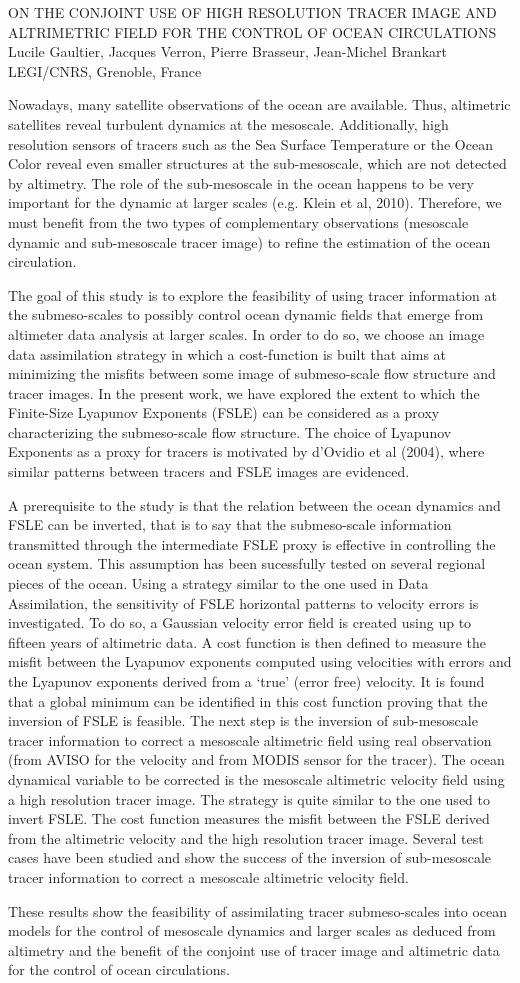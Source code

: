 ON THE CONJOINT USE OF HIGH RESOLUTION TRACER IMAGE AND ALTRIMETRIC FIELD FOR THE CONTROL OF OCEAN CIRCULATIONS
Lucile Gaultier, Jacques Verron, Pierre Brasseur, Jean-Michel Brankart
LEGI/CNRS, Grenoble, France


Nowadays, many satellite observations of the ocean are available. Thus, altimetric satellites reveal turbulent dynamics at the mesoscale.
Additionally, high resolution sensors of tracers such as the Sea Surface Temperature or the Ocean Color reveal even smaller structures at the sub-mesoscale, which are not detected by altimetry.
The role of the sub-mesoscale in the ocean happens to be very important for the dynamic at larger scales (e.g. Klein et al, 2010). 
Therefore, we must benefit from the two types of complementary observations (mesoscale dynamic and sub-mesoscale tracer image) to refine the estimation of the ocean circulation.

The goal of this study is to explore the feasibility of using tracer information at the submeso-scales to possibly control ocean dynamic fields that emerge from altimeter data analysis at larger scales. 
In order to do so, we choose an image data assimilation strategy in which a cost-function is built that aims at minimizing the misfits between some image of submeso-scale flow structure and tracer images. 
In the present work, we have explored the extent to which the Finite-Size Lyapunov Exponents (FSLE) can be considered as a proxy characterizing the submeso-scale flow structure. 
The choice of Lyapunov Exponents as a proxy for tracers is motivated by d'Ovidio et al (2004), where similar patterns between tracers and FSLE images are evidenced. 

A prerequisite to the study is that the relation between the ocean dynamics and FSLE can be inverted, that is to say that the submeso-scale information transmitted through the intermediate FSLE proxy is effective in controlling the ocean system. 
This assumption has been sucessfully tested on several regional pieces of the ocean.
Using a strategy similar to the one used in Data Assimilation, the sensitivity of FSLE horizontal patterns to velocity errors is investigated. 
To do so, a Gaussian velocity error field is created using up to fifteen years of altimetric data. 
A cost function is then defined to measure the misfit between the Lyapunov exponents computed using velocities with errors and the Lyapunov exponents derived from a `true' (error free) velocity. 
It is found that a global minimum can be identified in this cost function proving that the inversion of FSLE is feasible. 
The next step is the inversion of sub-mesoscale tracer information to correct a mesoscale altimetric field using real observation (from AVISO for the velocity and from MODIS sensor for the tracer). 
The ocean dynamical variable to be corrected is the mesoscale altimetric velocity field using a high resolution tracer image. 
The strategy is quite similar to the one used to invert FSLE. 
The cost function measures the misfit between the FSLE derived from the altimetric velocity and 
the high resolution tracer image. 
Several test cases have been studied and show the success of the inversion of sub-mesoscale tracer information to correct a mesoscale altimetric velocity field.

These results show the feasibility of assimilating tracer submeso-scales into ocean models for the control of mesoscale dynamics and larger scales as deduced from altimetry and the benefit of the conjoint use of tracer image and altimetric data for the control of ocean circulations.
